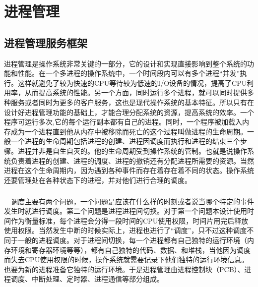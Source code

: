 \documentclass[UTF8,nofonts,cs4size]{ctexrep}
\begin{document}
\chapter{进程管理}
\section{进程管理服务框架}
进程管理是操作系统非常关键的一部分，它的设计和实现直接影响到整个系统的功能和性能。在一个多进程的操作系统中，一个时间段内可以有多个进程“并发”执行。这样就避免了较为快速的CPU等待较为低速的I/O设备的情况，提高了CPU利用率，从而提高系统的性能。另一个方面，同时运行多个进程，就可以同时提供多种服务或者同时为更多的客户服务，这也是现代操作系统的基本特征。所以只有在设计好进程管理功能的基础上，才能合理分配系统的资源，提高系统的效率。一个程序可运行多次,它的每个运行副本都有自己的进程。同时，一个程序被加载入内存成为一个进程直到他从内存中被移除而死亡的这个过程叫做进程的生命周期。一般一个进程的生命周期包括进程的创建、进程因调度而执行和进程的结束三个步骤。进程并非是自生自灭的。他的生命周期受到操作系统的管制。也就是说操作系统负责着进程的创建、进程的调度、进程的撤销还有分配进程所需要的资源。当然进程在这个生命周期内，因为遇到各种事件而存在着存在着不同的状态。操作系统还要管理处在各种状态下的进程，并对他们进行合理的调度。
\paragraph{}
\indent \ \ 
调度主要有两个问题，一个问题是应该在什么样的时刻或者说当哪个特定的事件发生时就进行调度。第二个问题是进程进程间切换。对于第一个问题本设计使用时间作为衡量标准，每个进程会分得一段时间的CPU使用权限，时间片用完后释放使用权限。当然发生中断的时候实际上，进程也进行了“调度”，只不过这种调度不同于一般的进程调度。对于进程间切换，每一个进程都有自己独特的运行环境（内存环境和寄存器环境等等），都有自己独特的代码、数据、和堆栈，当他因为调度而失去CPU使用权限的时候，操作系统就需要记录下他们独特的运行环境信息。也要为新的进程准备它独特的运行环境。于是进程管理由进程控制块（PCB）、进程调度、中断处理、定时器、进程通信等部分组成。
\end{document}
